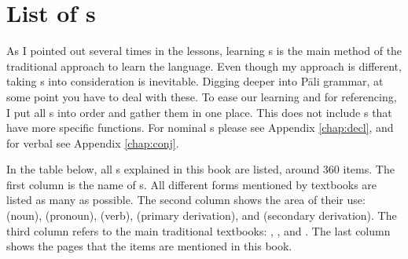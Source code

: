 \chapter{List of s}\label{chap:paccaya}

As I pointed out several times in the lessons, learning s is the main method of the traditional approach to learn the language. Even though my approach is different, taking s into consideration is inevitable. Digging deeper into P\=ali grammar, at some point you have to deal with these. To ease our learning and for referencing, I put all s into order and gather them in one place. This does not include s that have more specific functions. For nominal s please see Appendix \ref{chap:decl}, and for verbal see Appendix \ref{chap:conj}.

In the table below, all s explained in this book are listed, around 360 items. The first column is the name of s. All different forms mentioned by textbooks are listed as many as possible. The second column shows the area of their use:  (noun),  (pronoun),  (verb),  (primary derivation), and  (secondary derivation). The third column refers to the main traditional textbooks: , , and . The last column shows the pages that the items are mentioned in this book.

